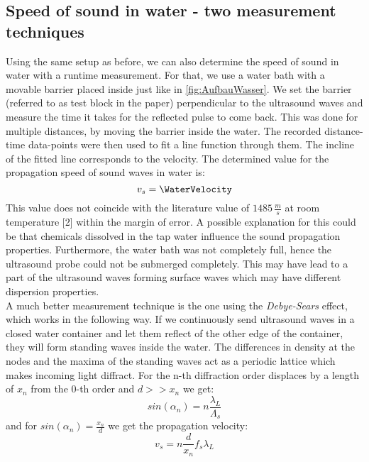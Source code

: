 \documentclass[a4paper,10pt,twocolumn]{article}
\begin{document}
    \subsection{Speed of sound in water - two measurement techniques}\label{subsec:SpeedinWater}
    Using the same setup as before, we can also determine the speed of sound in water with a runtime measurement.
    For that, we use a water bath with a movable barrier placed inside just like in \autoref{fig:AufbauWasser}.
    We set the barrier (referred to as test block in the paper) perpendicular to the ultrasound waves and measure the time it takes for the reflected pulse to come back.
    This was done for multiple distances, by moving the barrier inside the water.
    The recorded distance-time data-points were then used to fit a line function through them.
    The incline of the fitted line corresponds to the velocity.
    The determined value for the propagation speed of sound waves in water is:
    \begin{equation}
        v_s = \WaterVelocity
    \end{equation}
    This value does not coincide with the literature value of $1485\,\frac{m}{s}$ at room temperature [2] within the margin of error.
    A possible explanation for this could be that chemicals dissolved in the tap water influence the sound propagation properties.
    Furthermore, the water bath was not completely full, hence the ultrasound probe could not be submerged completely.
    This may have lead to a part of the ultrasound waves forming surface waves which may have different dispersion properties.
    \\
    A much better measurement technique is the one using the \textit{Debye-Sears} effect, which works in the following way.
    If we continuously send ultrasound waves in a closed water container and let them reflect of the other edge of the container, they will form standing waves inside the water.
    The differences in density at the nodes and the maxima of the standing waves act as a periodic lattice which makes incoming light diffract.
    For the n-th diffraction order displaces by a length of $x_n$ from the 0-th order and $d>>x_n$ we get:
    \begin{equation}\label{eq:diffraction}
        sin(\alpha_n) = n \frac{\lambda_L}{\Lambda_s}
    \end{equation}
    and for $sin(\alpha_n) = \frac{x_n}{d}$ we get the propagation velocity:
    \begin{equation}\label{eq:Velocitydebye}
        v_s = n \frac{d}{x_n} f_s \lambda_L
    \end{equation}
\end{document}
